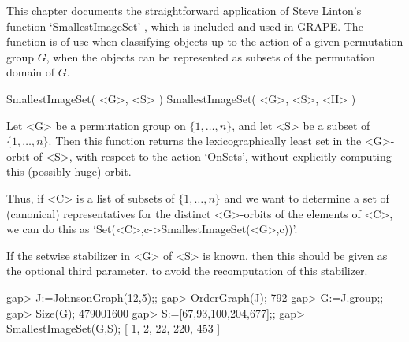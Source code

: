 %
%
%
%
\def\GRAPE{\sf GRAPE}
\def\nauty{\it nauty}
\def\G{\Gamma}
\def\Aut{{\rm Aut}\,}
\def\x{\times}

This chapter documents the straightforward application of Steve Linton's
function `SmallestImageSet' \cite{Lin04}, which is included and used
in {\GRAPE}. The function is of use when classifying objects up to
the action of a given permutation group $G$, when the objects can be
represented as subsets of the permutation domain of $G$.


\>SmallestImageSet( <G>, <S> )
\>SmallestImageSet( <G>, <S>, <H> )

Let <G> be a permutation group on $\{1,\ldots,n\}$, and let <S>
be a subset of $\{1,\ldots,n\}$. Then this function returns the
lexicographically least set in the <G>-orbit of <S>, with respect to the
action `OnSets', without explicitly computing this (possibly huge) orbit.

Thus, if <C> is a list of subsets of $\{1,\ldots,n\}$ and we
want to determine a set of (canonical) representatives for the
distinct <G>-orbits of the elements of <C>, we can do this as
`Set(<C>,c->SmallestImageSet(<G>,c))'.

If the setwise stabilizer in <G> of <S> is known, then this should be
given as the optional third parameter, to avoid the recomputation of
this stabilizer.

\beginexample
gap> J:=JohnsonGraph(12,5);;
gap> OrderGraph(J);
792
gap> G:=J.group;;
gap> Size(G);
479001600
gap> S:=[67,93,100,204,677];;
gap> SmallestImageSet(G,S);
[ 1, 2, 22, 220, 453 ]
\endexample

